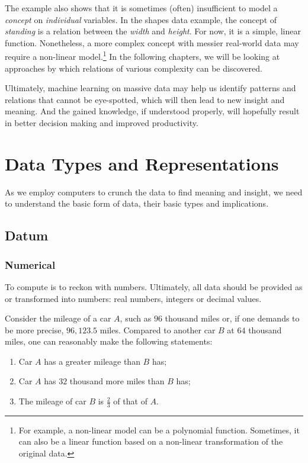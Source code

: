 \documentclass[
  letterpaper,
]{scrbook}
\begin{document}
The example also shows that it is sometimes (often) insufficient to
model a \emph{concept} on \emph{individual} variables. In the shapes
data example, the concept of \emph{standing} is a relation between the
\emph{width} and \emph{height}. For now, it is a simple, linear
function. Nonetheless, a more complex concept with messier real-world
data may require a non-linear model.\footnote{For example, a non-linear
  model can be a polynomial function. Sometimes, it can also be a linear
  function based on a non-linear transformation of the original data.}
In the following chapters, we will be looking at approaches by which
relations of various complexity can be discovered.

Ultimately, machine learning on massive data may help us identify
patterns and relations that cannot be eye-spotted, which will then lead
to new insight and meaning. And the gained knowledge, if understood
properly, will hopefully result in better decision making and improved
productivity.

\chapter{Data Types and Representations}\label{ch-representations}

As we employ computers to crunch the data to find meaning and insight,
we need to understand the basic form of data, their basic types and
implications.

\section{Datum}\label{datum}

\subsection{Numerical}\label{numerical}

To compute is to reckon with numbers. Ultimately, all data should be
provided as or transformed into numbers: real numbers, integers or
decimal values.

Consider the mileage of a car \(A\), such as \(96\) thousand miles or,
if one demands to be more precise, \(96,123.5\) miles. Compared to
another car \(B\) at \(64\) thousand miles, one can reasonably make the
following statements:

\begin{enumerate}
\def\labelenumi{\arabic{enumi}.}
\item
  Car \(A\) has a greater mileage than \(B\) has;
\item
  Car \(A\) has \(32\) thousand more miles than \(B\) has;
\item
  The mileage of car \(B\) is \(\frac{2}{3}\) of that of \(A\).
\end{enumerate}
\end{document}
